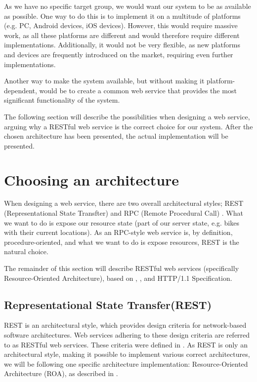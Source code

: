 As we have no specific target group, we would want our system to be as available as possible.
One way to do this is to implement it on a multitude of platforms (e.g. PC, Android devices, iOS devices).
However, this would require massive work, as all these platforms are different and would therefore require different implementations.
Additionally, it would not be very flexible, as new platforms and devices are frequently introduced on the market, requiring even further implementations.

Another way to make the system available, but without making it platform-dependent, would be to create a common web service that provides the most significant functionality of the system.

The following section will describe the possibilities when designing a web service, arguing why a RESTful web service is the correct choice for our system.
After the chosen architecture has been presented, the actual implementation will be presented.

\section{Choosing an architecture}
When designing a web service, there are two overall architectural styles; REST (Representational State Transfter) and RPC (Remote Procedural Call) \cite{restful_web_services}.
What we want to do is expose our resource state (part of our server state, e.g. bikes with their current locations).
As an RPC-style web service is, by definition, procedure-oriented, and what we want to do is expose resources, REST is the natural choice.

The remainder of this section will describe RESTful web services (specifically Resource-Oriented Architecture), based on \citet{restful_web_services}, \citet{fielding_dissertation}, and HTTP/1.1 Specification\cite{http_specification}.

\subsection{Representational State Transfer(REST)}
REST is an architectural style, which provides design criteria for network-based software architectures.
Web services adhering to these design criteria are referred to as RESTful web services.
These criteria were defined in \citet{fielding_dissertation}.
As REST is only an architectural style, making it possible to implement various correct architectures, we will be following one specific architecture implementation: Resource-Oriented Architecture (ROA), as described in \citet{restful_web_services}.

